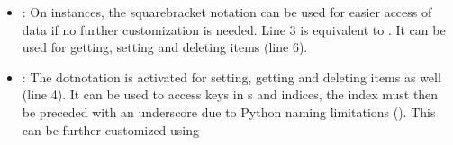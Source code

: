 \documentclass[a4paper,10pt,english]{sphinxmanual}
\begin{document}
\begin{sphinxVerbatim}[commandchars=\\\{\},numbers=left,firstnumber=1,stepnumber=1]
  
\PYG{p}{[}\PYG{p}{]}    
  
 \PYG{p}{[}  \PYG{p}{]}  
\end{sphinxVerbatim}
\begin{itemize}
\item {}
\sphinxAtStartPar
{}: On \sphinxhyphen{}instances, the square\sphinxhyphen{}bracket notation can be used for easier access of data if no further customization is needed. Line 3 is equivalent to . It can be used for getting, setting and deleting items (line 6).

\item {}
\sphinxAtStartPar
{}: The dot\sphinxhyphen{}notation is activated for setting, getting and deleting items as well (line 4). It can be used to access \sphinxhyphen{}keys in s and \sphinxhyphen{}indices, the index must then be preceded with an underscore due to Python naming limitations (). This can be further customized using {\hyperref[\detokenize{README:value-split}]{}}

\end{itemize}
\end{document}
